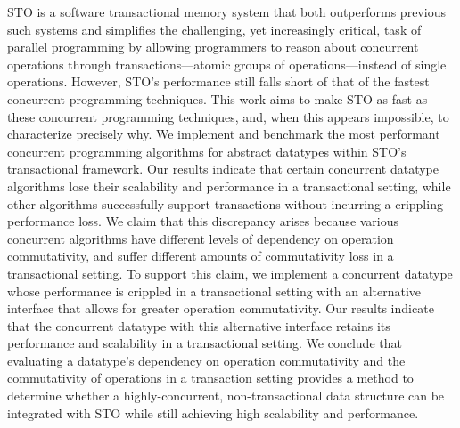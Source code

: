 STO is a software transactional memory system that both outperforms previous such systems and simplifies the challenging, yet increasingly critical, task of parallel programming by allowing programmers to reason about concurrent operations through transactions---atomic groups of operations---instead of single operations.  
However, STO's performance still falls short of that of the fastest concurrent programming techniques. This work aims to make STO as fast as these concurrent programming techniques, and, when this appears impossible, to characterize precisely why. 
We implement and benchmark the most performant concurrent programming algorithms for abstract datatypes within STO's transactional framework. Our results indicate that certain concurrent datatype algorithms lose their scalability and performance in a transactional setting, while other algorithms successfully support transactions without incurring a crippling performance loss. We claim that this discrepancy arises because various concurrent algorithms have different levels of dependency on operation commutativity, and suffer different amounts of commutativity loss in a transactional setting. To support this claim, we implement a concurrent datatype whose performance is crippled in a transactional setting with an alternative interface that allows for greater operation commutativity. Our results indicate that the concurrent datatype with this alternative interface retains its performance and scalability in a transactional setting.
We conclude that evaluating a datatype's dependency on operation commutativity and the commutativity of operations in a transaction setting provides a method to determine whether a highly-concurrent, non-transactional data structure can be integrated with STO while still achieving high scalability and performance.
